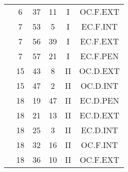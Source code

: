 \documentclass[12pt, a4paper]{article}
\begin{document}
\begin{multicols}{3}
{\begin{tabular}{c c c c c c}
	 	 	 	 & 6 & 37 & 11 & I & OC.F.EXT\\%
	 	 	 	 & 7 & 53 & 5 & I & EC.F.INT\\%
	 	 	 	 & 7 & 56 & 39 & I & EC.F.EXT\\%
	 	 	 	 & 7 & 57 & 21 & I & EC.F.PEN\\%
	 	 	 	 & 15 & 43 & 8 & II & OC.D.EXT\\%
	 	 	 	 & 15 & 47 & 2 & II & OC.D.INT\\%
	 	 	 	 & 18 & 19 & 47 & II & EC.D.PEN\\%
	 	 	 	 & 18 & 21 & 13 & II & EC.D.EXT\\%
	 	 	 	 & 18 & 25 & 3 & II & EC.D.INT\\%
	 	 	 	 & 18 & 32 & 16 & II & OC.F.INT\\%
	 	 	 	 & 18 & 36 & 10 & II & OC.F.EXT\\%
	 	 \end{tabular}
 	}
\end{multicols}
\end{document}
